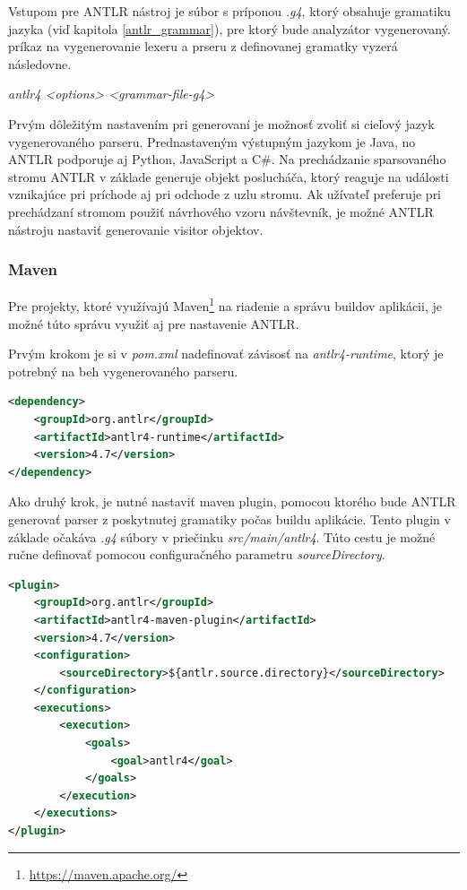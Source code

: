 Vstupom pre ANTLR nástroj je súbor s príponou \textit{.g4}, ktorý obsahuje gramatiku jazyka (viď kapitola \ref{antlr_grammar}), pre ktorý bude analyzátor vygenerovaný. príkaz na vygenerovanie lexeru a prseru z definovanej gramatky vyzerá následovne.
\begin{center}
\textit{antlr4 <options> <grammar-file-g4>}
\end{center}

Prvým dôležitým nastavením pri generovaní je možnosť zvoliť si cieľový jazyk vygenerovaného parseru. Prednastaveným výstupným jazykom je Java, no ANTLR podporuje aj Python, JavaScript a C\#. Na prechádzanie sparsovaného stromu ANTLR v základe generuje objekt poslucháča, ktorý reaguje na události vznikajúce pri príchode aj pri odchode z uzlu stromu. Ak užívateľ preferuje pri prechádzaní stromom použiť návrhového vzoru návštevník, je možné ANTLR nástroju nastaviť generovanie visitor objektov.

\subsubsection{Maven}
Pre projekty, ktoré využívajú Maven\footnote{\url{https://maven.apache.org/}} na riadenie a správu buildov aplikácii, je možné túto správu využiť aj pre nastavenie ANTLR.

Prvým krokom je si v \textit{pom.xml} nadefinovať závisosť na \textit{antlr4-runtime}, ktorý je potrebný na beh vygenerovaného parseru.

\begin{lstlisting}[language=XML, frame=none, numbers=none]
<dependency>
    <groupId>org.antlr</groupId>
    <artifactId>antlr4-runtime</artifactId>
    <version>4.7</version>
</dependency>
\end{lstlisting}

Ako druhý krok, je nutné nastaviť maven plugin, pomocou ktorého bude ANTLR generovať parser z poskytnutej gramatiky počas buildu aplikácie. Tento plugin v základe očakáva \textit{.g4} súbory v priečinku \textit{src/main/antlr4}. Túto cestu je možné ručne definovať pomocou configuračného parametru \textit{sourceDirectory}.

\begin{minipage}{\linewidth}
\begin{lstlisting}[language=XML, frame=none, numbers=none]
<plugin>
    <groupId>org.antlr</groupId>
    <artifactId>antlr4-maven-plugin</artifactId>
    <version>4.7</version>
    <configuration>
        <sourceDirectory>${antlr.source.directory}</sourceDirectory>
    </configuration>
    <executions>
        <execution>
            <goals>
                <goal>antlr4</goal>
            </goals>
        </execution>
    </executions>
</plugin>
\end{lstlisting}
\end{minipage}

